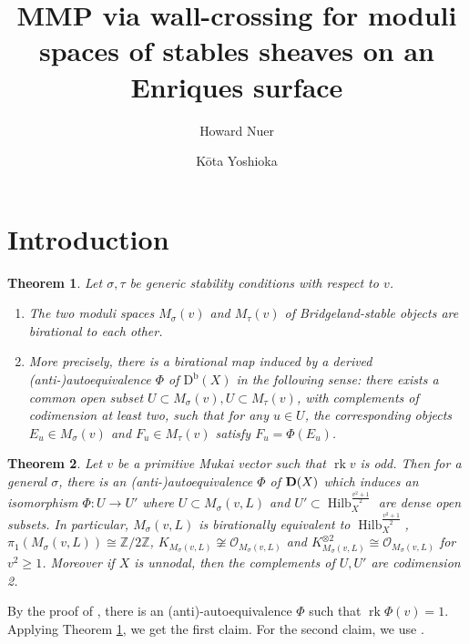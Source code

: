 \documentclass[leqno,11pt]{amsart}
\def\Z{\ensuremath{\mathbb{Z}}}
\def\Hilb{\mathop{\mathrm{Hilb}}\nolimits}
\def\rk{\mathop{\mathrm{rk}}}
\def\Db{\mathrm{D}^{\mathrm{b}}}
\newtheorem{Thm}{Theorem}[section]
\theoremstyle{definition}
\def\Z{\ensuremath{\mathbb{Z}}}
\def\OO{\ensuremath{\mathcal O}}
\begin{document}
\author{Howard Nuer}
\author{K\={o}ta Yoshioka}
\title[MMP via wall-crossing for moduli sheaves on Enriques surfaces]{MMP via wall-crossing for moduli spaces of stables sheaves on an Enriques surface}
\maketitle
\setcounter{tocdepth}{1}
\tableofcontents
\section{Introduction}

\begin{Thm}\label{Thm:MainTheorem1}
Let $\sigma,\tau$ be generic stability conditions with respect to $v$.
\begin{enumerate}
\item The two moduli spaces $M_{\sigma}(v)$ and $M_{\tau}(v)$ of Bridgeland-stable objects are birational to each other.
\item More precisely, there is a birational map induced by a derived (anti-)autoequivalence $\Phi$ of $\Db(X)$ in the following sense: there exists a common open subset $U\subset M_{\sigma}(v),U\subset M_{\tau}(v)$, with complements of codimension at least two, such that for any $u\in U$, the corresponding objects $E_u\in M_{\sigma}(v)$ and $F_u\in M_{\tau}(v)$ satisfy $F_u=\Phi(E_u)$.
\end{enumerate}
\end{Thm}


\begin{Thm}\label{Thm:application1}
Let $v$ be a primitive Mukai vector such that $\rk v$ is odd.
Then for a general $\sigma$,
there is an (anti-)autoequivalence $\Phi$ of ${\bf D}(X)$
which induces an isomorphism $\Phi:U \to U'$
where $U \subset M_\sigma(v,L)$ and 
$U' \subset \Hilb_X^{\frac{v^2+1}{2}}$ are dense open subsets.  
In particular, $M_\sigma(v,L)$ is birationally equivalent to
$\Hilb_X^{\frac{v^2+1}{2}}$, 
$\pi_1(M_\sigma(v,L)) \cong \Z/2 \Z$,
$K_{M_\sigma(v,L)} \not \cong  \OO_{M_\sigma(v,L)}$ and 
$K_{M_\sigma(v,L)}^{\otimes 2} \cong  \OO_{M_\sigma(v,L)}$
for $v^2 \geq 1$. 
Moreover if $X$ is unnodal, then the complements of $U,U'$ are codimension 2.
\end{Thm}

By the proof of \cite{Yos03}, there is an (anti)-autoequivalence
$\Phi$ such that $\rk \Phi(v) =1$.
Applying Theorem \ref{Thm:MainTheorem1}, we get the first claim.
For the second claim, we use \cite[sect. 1]{OS}.
\end{document}
